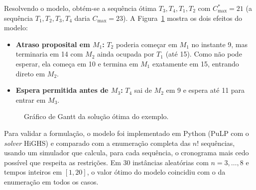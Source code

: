 \documentclass[11pt,a4paper]{article}
\begin{document}
Resolvendo o modelo, obtém-se a sequência ótima $T_3, T_4, T_1, T_2$ com
$C_{\max}^* = 21$ (a sequência $T_1,T_2,T_3,T_4$ daria $C_{\max}=23$). A
Figura~\ref{fig:gantt} mostra os dois efeitos do modelo:
\begin{itemize}
  \item \textbf{Atraso proposital em $M_1$:} $T_2$ poderia começar em $M_1$ no
        instante 9, mas terminaria em 14 com $M_2$ ainda ocupada por $T_1$ (até
        15). Como não pode esperar, ela começa em 10 e termina em $M_1$
        exatamente em 15, entrando direto em $M_2$.
  \item \textbf{Espera permitida antes de $M_3$:} $T_4$ sai de $M_2$ em 9 e
        espera até 11 para entrar em $M_3$.
\end{itemize}

\begin{figure}[h]
\centering
{}
\caption{Gráfico de Gantt da solução ótima do exemplo.}
\label{fig:gantt}
\end{figure}

Para validar a formulação, o modelo foi implementado em Python (PuLP com o
\emph{solver} HiGHS) e comparado com a enumeração completa das $n!$ sequências,
usando um simulador que calcula, para cada sequência, o cronograma mais cedo
possível que respeita as restrições. Em 30 instâncias aleatórias com
$n = 3,\dots,8$ e tempos inteiros em $[1,20]$, o valor ótimo do modelo
coincidiu com o da enumeração em todos os casos.
\end{document}
